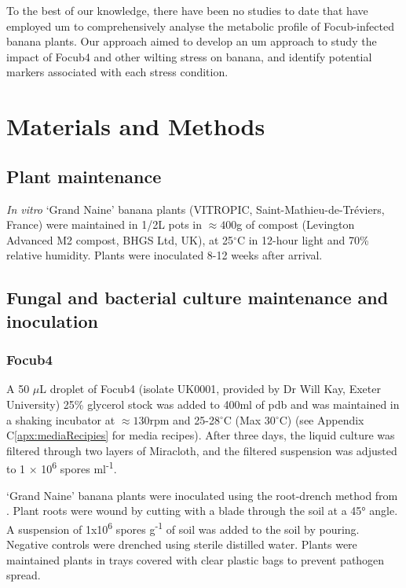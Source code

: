 To the best of our knowledge, there have been no studies to date that have employed \ac{um} to comprehensively analyse the metabolic profile of \ac{Focub}-infected banana plants. Our approach aimed to develop an \ac{um} approach to study the impact of \ac{Focub4} and other wilting stress on banana, and identify potential markers associated with each stress condition. 

\newpage
\section{Materials and Methods}
\label{sec:Chapter4_MM}

\subsection{Plant maintenance}
\textit{In vitro} ‘Grand Naine’ banana plants (VITROPIC, Saint-Mathieu-de-Tréviers, France) were maintained in 1/2L pots in $\approx400$g of compost (Levington Advanced M2 compost, BHGS Ltd, UK), at 25$^{\circ}$C in 12-hour light and 70\% relative humidity. Plants were inoculated 8-12 weeks after arrival. 

\subsection{Fungal and bacterial culture maintenance and inoculation}

\subsubsection{\acl{Focub4}}
A 50 \(\mu\)L droplet of \acl{Focub4} (isolate UK0001, provided by Dr Will Kay, Exeter University) 25\% glycerol stock was added to 400ml of \acf{pdb} and was maintained in a shaking incubator at $\approx130$rpm and 25-28$^{\circ}$C (Max 30$^{\circ}$C) (see Appendix C\ref{apx:mediaRecipies} for media recipes). After three days, the liquid culture was filtered through two layers of Miracloth, and the filtered suspension was adjusted to 1 × 10\textsuperscript{6} spores ml\textsuperscript{-1}.

‘Grand Naine’ banana plants were inoculated using the root-drench method from \textcite{Garcia-Bastidas2019}. Plant roots were wound by cutting with a blade through the soil at a 45° angle. A suspension of 1x10\textsuperscript{6} spores g\textsuperscript{-1} of soil was added to the soil by pouring. Negative controls were drenched using sterile distilled water. Plants were maintained plants in trays covered with clear plastic bags to prevent pathogen spread. 

